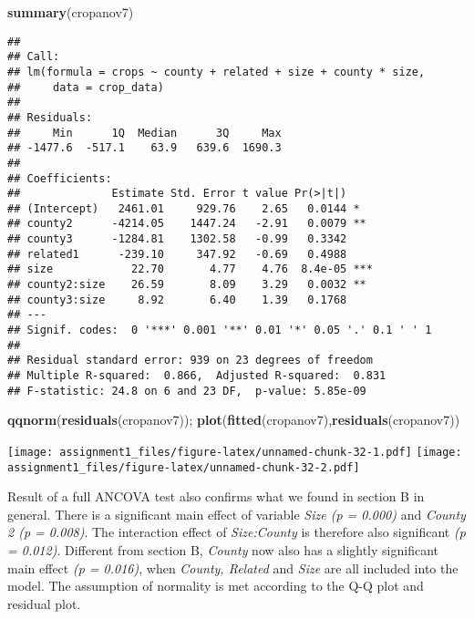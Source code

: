 \documentclass[
]{article}
\newenvironment{Shaded}{\begin{snugshade}}{\end{snugshade}}
\newcommand{\FunctionTok}[1]{\textcolor[rgb]{0.13,0.29,0.53}{\textbf{#1}}}
\newcommand{\NormalTok}[1]{#1}
\begin{document}
\begin{Shaded}
\begin{Highlighting}[]
\FunctionTok{summary}\NormalTok{(cropanov7)}
\end{Highlighting}
\end{Shaded}

\begin{verbatim}
## 
## Call:
## lm(formula = crops ~ county + related + size + county * size, 
##     data = crop_data)
## 
## Residuals:
##     Min      1Q  Median      3Q     Max 
## -1477.6  -517.1    63.9   639.6  1690.3 
## 
## Coefficients:
##              Estimate Std. Error t value Pr(>|t|)    
## (Intercept)   2461.01     929.76    2.65   0.0144 *  
## county2      -4214.05    1447.24   -2.91   0.0079 ** 
## county3      -1284.81    1302.58   -0.99   0.3342    
## related1      -239.10     347.92   -0.69   0.4988    
## size            22.70       4.77    4.76  8.4e-05 ***
## county2:size    26.59       8.09    3.29   0.0032 ** 
## county3:size     8.92       6.40    1.39   0.1768    
## ---
## Signif. codes:  0 '***' 0.001 '**' 0.01 '*' 0.05 '.' 0.1 ' ' 1
## 
## Residual standard error: 939 on 23 degrees of freedom
## Multiple R-squared:  0.866,  Adjusted R-squared:  0.831 
## F-statistic: 24.8 on 6 and 23 DF,  p-value: 5.85e-09
\end{verbatim}

\begin{Shaded}
\begin{Highlighting}[]
\FunctionTok{qqnorm}\NormalTok{(}\FunctionTok{residuals}\NormalTok{(cropanov7)); }\FunctionTok{plot}\NormalTok{(}\FunctionTok{fitted}\NormalTok{(cropanov7),}\FunctionTok{residuals}\NormalTok{(cropanov7))}
\end{Highlighting}
\end{Shaded}

\texttt{[image: assignment1\_files/figure-latex/unnamed-chunk-32-1.pdf]}
\texttt{[image: assignment1\_files/figure-latex/unnamed-chunk-32-2.pdf]}

Result of a full ANCOVA test also confirms what we found in section B in
general. There is a significant main effect of variable \emph{Size (p =
0.000)} and \emph{County 2 (p = 0.008)}. The interaction effect of
\emph{Size:County} is therefore also significant \emph{(p = 0.012)}.
Different from section B, \emph{County} now also has a slightly
significant main effect \emph{(p = 0.016)}, when \emph{County, Related}
and \emph{Size} are all included into the model. The assumption of
normality is met according to the Q-Q plot and residual plot.
\end{document}
